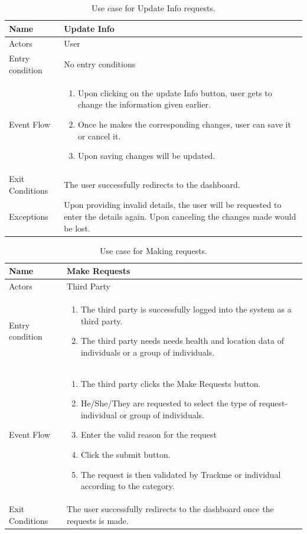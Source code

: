 \begin{table}[H]
\begin{tabular}{| l | p{} |}
\hline
Name & Update Info\\
\hline
Actors & User\\
\hline
Entry condition & No entry conditions\\
\hline
Event Flow & \begin{enumerate}
\item Upon clicking on the update Info button, user gets to change the information given earlier.
\item Once he makes the corresponding changes, user can save it or cancel it.
\item Upon saving changes will be updated.
\end{enumerate}
\\
\hline
Exit Conditions & 
The user successfully redirects to the dashboard.\\
\hline
Exceptions & Upon providing invalid details, the user will be requested to enter the details again. Upon canceling the changes made would be lost.\\
\hline
\end{tabular}
\caption{Use case for Update Info requests.}
\label{usecase-taxiavailability}
\end{table}

\begin{table}[H]
\begin{tabular}{| l | p{} |}
\hline
Name & Make Requests\\
\hline
Actors & Third Party\\
\hline
Entry condition & \begin{enumerate}
\item The third party is successfully logged into the system as a third party.
\item The third party needs needs health and location data of individuals or a group of individuals.
\end{enumerate}\\
\hline
Event Flow & \begin{enumerate}
\item The third party clicks the Make Requests button.
\item He/She/They are requested to select the type of request- individual or group of individuals.
\item Enter the valid reason for the request
\item Click the submit button.
\item The request is then validated by Trackme or individual according to the category.
\end{enumerate}
\\
\hline
Exit Conditions & The user successfully redirects to the dashboard once the requests is made.\\
\hline
\end{tabular}
\caption{Use case for Making requests.}
\label{usecase-Making-requests}
\end{table}

